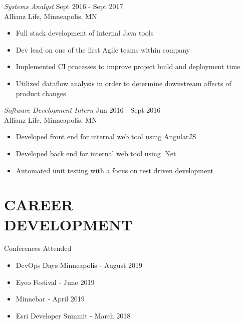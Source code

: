 \documentclass[margin]{res}
\begin{document}
\begin{resume}
                {\sl Systems Analyst} \hfill Sept 2016 - Sept 2017 \\
                Allianz Life,
                Minneapolis, MN
                \begin{itemize}  \itemsep -2pt %
                \item Full stack development of internal Java tools
                \item Dev lead on one of the first Agile teams within company
                \item Implemented CI processes to improve project build and deployment time
                \item Utilized dataflow analysis in order to determine downstream affects of product changes
                \end{itemize}

                {\sl Software Development Intern} \hfill Jun 2016 - Sept 2016 \\
                Allianz Life,
                Minneapolis, MN
                \begin{itemize}  \itemsep -2pt %
                \item Developed front end for internal web tool using AngularJS
                \item Developed back end for internal web tool using .Net
                \item Automated unit testing with a focus on test driven development
                \end{itemize}

\section{CAREER \\ DEVELOPMENT}
                Conferences Attended
                \begin{itemize} \itemsep -2pt
			  \item DevOps Days Minneapolis - August 2019
			  \item Eyeo Festival - June 2019
			  \item Minnebar - April 2019
                \item Esri Developer Summit - March 2018
                \end{itemize}

\end{resume}
\end{document}
